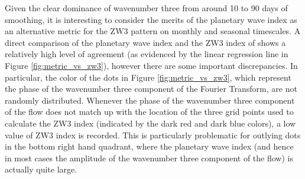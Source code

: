 Given the clear dominance of wavenumber three from around 10 to 90 days of smoothing, it is interesting to consider the merits of the planetary wave index as an alternative metric for the ZW3 pattern on monthly and seasonal timescales. A direct comparison of the planetary wave index and the ZW3 index of \citet{Raphael2004} shows a relatively high level of agreement (as evidenced by the linear regression line in Figure \ref{fig:metric_vs_zw3}), however there are some important discrepancies. In particular, the color of the dots in Figure \ref{fig:metric_vs_zw3}, which represent the phase of the wavenumber three component of the Fourier Transform, are not randomly distributed. Whenever the phase of the wavenumber three component of the flow does not match up with the location of the three grid points used to calculate the ZW3 index (indicated by the dark red and dark blue colors), a low value of ZW3 index is recorded. This is particularly problematic for outlying dots in the bottom right hand quadrant, where the planetary wave index (and hence in most cases the amplitude of the wavenumber three component of the flow) is actually quite large.      

